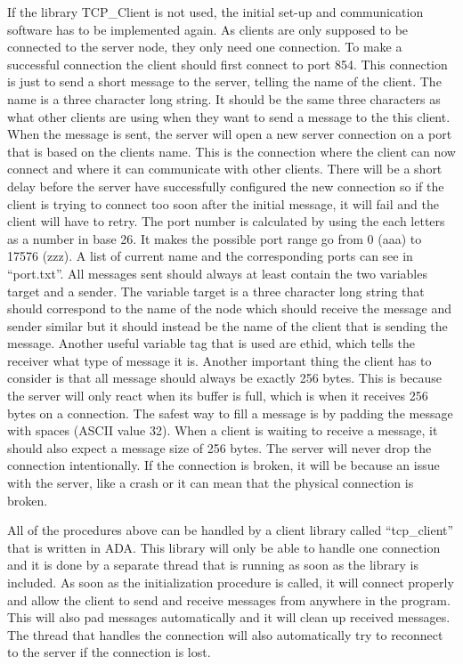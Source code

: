 \newline \noindent If the library TCP_Client is not used, the initial set-up and communication software has to be implemented again. As clients are only supposed to be connected to the server node, they only need one connection. To make a successful connection the client should first connect to port 854. This connection is just to send a short message to the server, telling the name of the client. The name is a three character long string. It should be the same three characters as what other clients are using when they want to send a message to the this client. When the message is sent, the server will open a new server connection on a port that is based on the clients name. This is the connection where the client can now connect and where it can communicate with other clients. There will be a short delay before the server have successfully configured the new connection so if the client is trying to connect too soon after the initial message, it will fail and the client will have to retry. The port number is calculated by using the each letters as a number in base 26. It makes the possible port range go from 0 (aaa) to 17576 (zzz). A list of current name and the corresponding ports can see in “port.txt”. All messages sent should always at least contain the two variables target and a sender. The variable target is a three character long string that should correspond to the name of the node which should receive the message and sender similar but it should instead be the name of the client that is sending the message. Another useful variable tag that is used are ethid, which tells the receiver what type of message it is. Another important thing the client has to consider is that all message should always be exactly 256 bytes. This is because the server will only react when its buffer is full, which is when it receives 256 bytes on a connection. The safest way to fill a message is by padding the message with spaces (ASCII value 32). When a client is waiting to receive a message, it should also expect a message size of 256 bytes. The server will never drop the connection intentionally. If the connection is broken, it will be because an issue with the server, like a crash or it can mean that the physical connection is broken. 



\newline \noindent All of the procedures above can be handled by a client library called “tcp_client” that is written in ADA. This library will only be able to handle one connection and it is done by a separate thread that is running as soon as the library is included. As soon as the initialization procedure is called, it will connect properly and allow the client to send and receive messages from anywhere in the program. This will also pad messages automatically and it will clean up received messages. The thread that handles the connection will also automatically try to reconnect to the server if the connection is lost.






